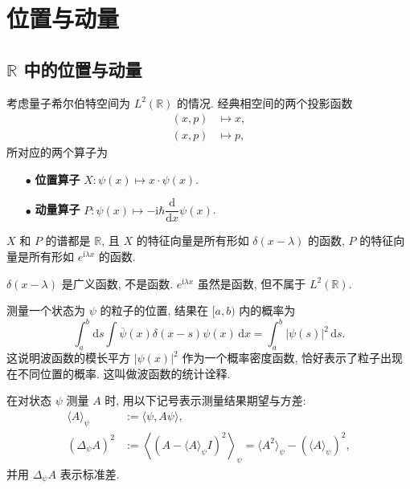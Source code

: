 \section{位置与动量}
\subsection{\texorpdfstring{$ \mathbb{R} $}{R} 中的位置与动量}
考虑量子希尔伯特空间为 $ L^2(\mathbb{R}) $ 的情况. 经典相空间的两个投影函数
\begin{align*}
    (x,p)&\mapsto x,\\
    (x,p)&\mapsto p,
\end{align*}
所对应的两个算子为
\begin{enumerate}
    \item[$ \bullet $] {\bf 位置算子} $ X:\psi(x)\mapsto x\cdot\psi(x) $.
    \item[$ \bullet $] {\bf 动量算子} $ P:\psi(x)\mapsto-\mathrm{i}\hbar\dfrac{\mathrm{d}}{\mathrm{d}x}\psi(x) $.
\end{enumerate}

$ X $ 和 $ P $ 的谱都是 $ \mathbb{R} $, 且 $ X $ 的特征向量是所有形如 $ \delta(x-\lambda) $ 的函数, $ P $ 的特征向量是所有形如 $ e^{\mathrm{i}\lambda x} $ 的函数.

\begin{remark}
    $ \delta(x-\lambda) $ 是广义函数, 不是函数. $ e^{\mathrm{i}\lambda x} $ 虽然是函数, 但不属于 $ L^2(\mathbb{R}) $.
\end{remark}

测量一个状态为 $ \psi $ 的粒子的位置, 结果在 $ [a,b) $ 内的概率为
\[ \int_{a}^{b}\mathrm{d}s\int\overline{\psi}(x)\delta(x-s)\psi(x)\,\mathrm{d}x=\int_{a}^{b}|\psi(s)|^2\,\mathrm{d}s. \]
这说明波函数的模长平方 $ |\psi(x)|^2 $ 作为一个概率密度函数, 恰好表示了粒子出现在不同位置的概率. 这叫做波函数的统计诠释.

在对状态 $ \psi $ 测量 $ A $ 时, 用以下记号表示测量结果期望与方差:
\begin{align*}
    \langle A\rangle_\psi&:=\langle\psi,A\psi\rangle,\\ 
    (\Delta_\psi A)^2&:=\left\langle (A-\langle A\rangle_\psi I)^2 \right\rangle_\psi=\langle A^2\rangle_\psi-\left( \langle A\rangle_\psi \right)^2,
\end{align*}
并用 $ \Delta_\psi A $ 表示标准差.

